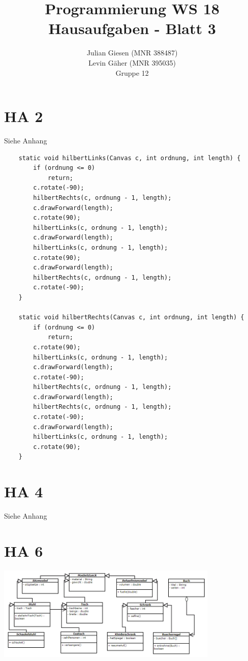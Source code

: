 \documentclass[a4paper]{article}
\title{ Programmierung WS 18 \\ Hausaufgaben - Blatt 3 }
\author{ Julian Giesen (MNR 388487) \\
Levin Gäher (MNR 395035) \\
Gruppe 12 }
\date{  }
\begin{document}
\maketitle

\section*{ HA 2 }

Siehe Anhang

\begin{lstlisting}
	static void hilbertLinks(Canvas c, int ordnung, int length) {
		if (ordnung <= 0)
			return;
		c.rotate(-90);
		hilbertRechts(c, ordnung - 1, length);
		c.drawForward(length);
		c.rotate(90);
		hilbertLinks(c, ordnung - 1, length);
		c.drawForward(length);
		hilbertLinks(c, ordnung - 1, length);
		c.rotate(90);
		c.drawForward(length);
		hilbertRechts(c, ordnung - 1, length);
		c.rotate(-90);
	}

	static void hilbertRechts(Canvas c, int ordnung, int length) {
		if (ordnung <= 0)
			return;
		c.rotate(90);
		hilbertLinks(c, ordnung - 1, length);
		c.drawForward(length);
		c.rotate(-90);
		hilbertRechts(c, ordnung - 1, length);
		c.drawForward(length);
		hilbertRechts(c, ordnung - 1, length);
		c.rotate(-90);
		c.drawForward(length);
		hilbertLinks(c, ordnung - 1, length);
		c.rotate(90);
	}
\end{lstlisting}

\section*{ HA 4 }

Siehe Anhang

\section*{ HA 6 }

	\includegraphics*[width=400px]{Nr6_UML_Graph.PNG}
\end{document}
